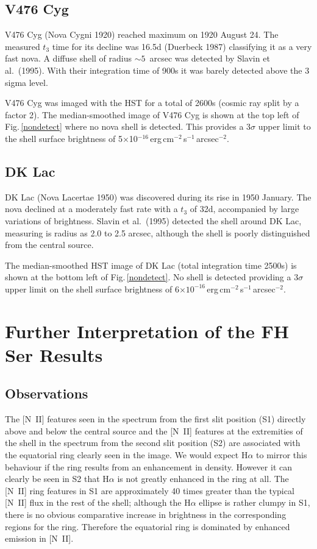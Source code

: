 \subsection{V476 Cyg}
V476 Cyg (Nova Cygni 1920) reached maximum on 1920 August 24. The
measured $t_3$ time for its decline was 16.5d (Duerbeck 1987)
classifying it as a very fast nova. A diffuse shell of radius $\sim 5$~arcsec
was detected by Slavin et al.\ (1995). With their
integration time of 900s it was barely detected above the 3 sigma level.

V476 Cyg was imaged with the HST for a total of 2600s (cosmic ray split by a
factor 2). The median-smoothed image of V476 Cyg is shown at the top left
of Fig.\,\ref{nondetect} where no nova shell is detected. This provides 
a 3$\sigma$ upper limit to the shell surface brightness of 
5$\times$10$^{-16}$\,erg\,cm$^{-2}$\,s$^{-1}$\,arcsec$^{-2}$.

\subsection{DK Lac}
DK Lac (Nova Lacertae 1950) was discovered during its rise in 1950 January.
The nova declined at a moderately fast rate with a $t_3$ of 32d,
accompanied by large variations of brightness. Slavin et al.\ (1995) 
detected the shell
around DK Lac, measuring is radius as 2.0 to 2.5 arcsec,
although the shell is poorly distinguished from the central source.

The median-smoothed HST image of DK Lac (total integration time 2500s) is
shown at the bottom left of Fig.\,\ref{nondetect}. No shell is detected
providing a 3$\sigma$ upper limit on the shell surface brightness of 
6$\times 10^{-16}$\,erg\,cm$^{-2}$\,s$^{-1}$\,arcsec$^{-2}$.

\section{Further Interpretation of the FH Ser Results}
\label{int}
\subsection{Observations} 
The [N~II] features seen in the spectrum from the first slit position (S1)
directly above and below the central source and the [N~II] features at
the extremities of the shell in the spectrum from the second slit position (S2)
are associated
with the equatorial ring clearly seen in the image. 
We would expect H$\alpha$ to mirror this
behaviour if the ring results from an enhancement in density.
However it can clearly be seen in
S2 that H$\alpha$ is not greatly enhanced in the ring at all. The
[N~II] ring features in S1 are approximately 40 times greater than the
typical [N~II] flux in the rest of the shell; 
although the H$\alpha$ ellipse is
rather clumpy in S1, there is no obvious
comparative increase in brightness in the corresponding regions for the
ring. Therefore the equatorial ring is dominated by enhanced 
emission in [N~II].

